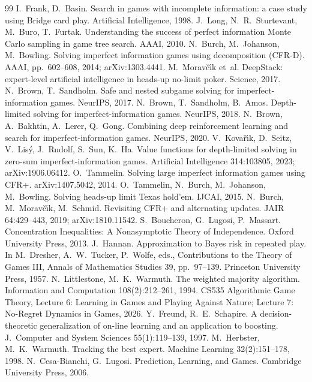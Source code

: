 \documentclass[10pt]{article}
\theoremstyle{plain}
\theoremstyle{definition}
\theoremstyle{remark}
\begin{document}
\begin{thebibliography}{99}
 I.~Frank, D.~Basin. Search in games with incomplete information: a case study using Bridge card play. Artificial Intelligence, 1998.
 J.~Long, N.~R.~Sturtevant, M.~Buro, T.~Furtak. Understanding the success of perfect information Monte Carlo sampling in game tree search. AAAI, 2010.
 N.~Burch, M.~Johanson, M.~Bowling. Solving imperfect information games using decomposition (CFR-D). AAAI, pp.~602--608, 2014; arXiv:1303.4441.
 M.~Morav\v{c}\'{\i}k et~al. DeepStack: expert-level artificial intelligence in heads-up no-limit poker. Science, 2017.
 N.~Brown, T.~Sandholm. Safe and nested subgame solving for imperfect-information games. NeurIPS, 2017.
 N.~Brown, T.~Sandholm, B.~Amos. Depth-limited solving for imperfect-information games. NeurIPS, 2018.
 N.~Brown, A.~Bakhtin, A.~Lerer, Q.~Gong. Combining deep reinforcement learning and search for imperfect-information games. NeurIPS, 2020.
 V.~Kova\v{r}\'{\i}k, D.~Seitz, V.~Lis\'y, J.~Rudolf, S.~Sun, K.~Ha. Value functions for depth-limited solving in zero-sum imperfect-information games. Artificial Intelligence 314:103805, 2023; arXiv:1906.06412.
 O.~Tammelin. Solving large imperfect information games using CFR+. arXiv:1407.5042, 2014.
 O.~Tammelin, N.~Burch, M.~Johanson, M.~Bowling. Solving heads-up limit Texas hold'em. IJCAI, 2015.
 N.~Burch, M.~Morav\v{c}\'{\i}k, M.~Schmid. Revisiting CFR+ and alternating updates. JAIR 64:429--443, 2019; arXiv:1810.11542.
 S.~Boucheron, G.~Lugosi, P.~Massart. Concentration Inequalities: A Nonasymptotic Theory of Independence. Oxford University Press, 2013.
 J.~Hannan. Approximation to Bayes risk in repeated play. In M.~Dresher, A.~W.~Tucker, P.~Wolfe, eds., Contributions to the Theory of Games III, Annals of Mathematics Studies 39, pp.~97--139. Princeton University Press, 1957.
 N.~Littlestone, M.~K.~Warmuth. The weighted majority algorithm. Information and Computation 108(2):212--261, 1994.
 CS535 Algorithmic Game Theory, Lecture 6: Learning in Games and Playing Against Nature; Lecture 7: No-Regret Dynamics in Games, 2026.
 Y.~Freund, R.~E.~Schapire. A decision-theoretic generalization of on-line learning and an application to boosting. J.\ Computer and System Sciences 55(1):119--139, 1997.
 M.~Herbster, M.~K.~Warmuth. Tracking the best expert. Machine Learning 32(2):151--178, 1998.
 N.~Cesa-Bianchi, G.~Lugosi. Prediction, Learning, and Games. Cambridge University Press, 2006.

\end{thebibliography}
\end{document}
